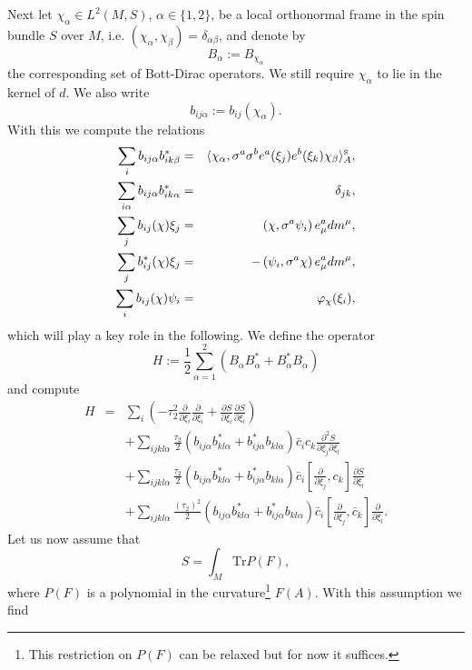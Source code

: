 \documentclass[12pt]{article}
\newcommand{\nn}{\nonumber}
\def\a{\alpha}
\def\b{\beta}
\def\d{\delta}
\def\m{\mu}
\newcommand{\pa}{\partial}
\begin{document}
Next let $\chi_\a\in L^2(M,S)$, $\a\in\{1,2\}$, be a local orthonormal frame in the spin bundle $S$ over $M$, i.e. $(\chi_\a, \chi_\b)= \d_{\a\b}$, and denote by
\begin{equation}
B_\a := B_{\chi_\a}
\label{simpleminds}
\end{equation}
the corresponding set of Bott-Dirac operators. We still require $\chi_\a$ to lie in the kernel of $d$. We also write
$$ b_{ij\a}:= b_{ij}(\chi_\a).$$
With this we compute the relations
\begin{eqnarray}
\sum_{i} b_{ij\a} b_{ik\b}^* &=&  \langle {\chi}_\a, \sigma^a \sigma^b e^a(\xi_j)  e^b(\xi_k)  \chi_\b \rangle_{A}^{\mbox{\tiny S}},
\label{K1}\\
\sum_{i\a} b_{ij\a} b_{ik\a}^*&=& \d_{jk}, 
\label{K3}\\
\sum_j b_{ij}(\chi)\xi_j &=& \left(\chi, \sigma^a   \psi_i  \right) e^a_\m  dm^\m ,
\label{K4}\\
\sum_j b^*_{ij}(\chi)\xi_j &=&- \left(   \psi_i, \sigma^a \chi   \right) e^a_\m  dm^\m ,
\label{K5}\\
\sum_i b_{ij}(\chi) \psi_i &=& \varphi_\chi(\xi_i),
\label{K6}
\end{eqnarray}
which will play a key role in the following. We define the operator
\begin{equation}
H:=\frac{1}{2}\sum_{\a=1}^2 \left( B_\a B_\a^*  +  B_\a^*B_\a  \right) 
\label{byraad}
\end{equation}
and compute
\begin{eqnarray}
H &=&  \sum_{i}    \left(  -\tau_2^2     \frac{\pa}{\pa\xi_{i }}  \frac{\pa}{\pa\xi_{i }}    
+  \frac{\pa S}{\pa \xi_i}\frac{\pa S}{\pa \xi_i}  \right)
\nn\\&&
+ \sum_{ijkl\a} \frac{\tau_2}{2} \left(  b_{ij\a} b_{kl\a}^*+ b_{ij\a}^* b_{kl\a} \right) \bar{c}_i   {c}_{k}    \frac{\pa^2 S}{\pa \xi_j\pa \xi_l } 
\nn\\&&
+ \sum_{ijkl\a} \frac{\tau_2}{2} \left(  b_{ij\a} b_{kl\a}^*+ b_{ij\a}^* b_{kl\a} \right) \bar{c}_i   \left[\frac{\pa}{\pa \xi_j }  , {c}_{k} \right]  \frac{\pa S}{\pa \xi_l }  
\nn\\&&
+ \sum_{ijkl\a} \frac{\left(\tau_2\right)^2}{2} \left(  b_{ij\a} b_{kl\a}^*+ b_{ij\a}^* b_{kl\a} \right) \bar{c}_i  \left[  \frac{\pa}{\pa \xi_j }  , \bar{c}_{k}\right]   \frac{\pa}{\pa \xi_l }     .
\label{b22}
\end{eqnarray}
%
%
%
%
Let us now assume that 
$$
S= \int_M \mbox{Tr}  P(F),
$$
where $P(F)$ is a polynomial in the curvature\footnote{This restriction on $P(F)$ can be relaxed but for now it suffices.} $F(A)$. With this assumption we find
\end{document}
